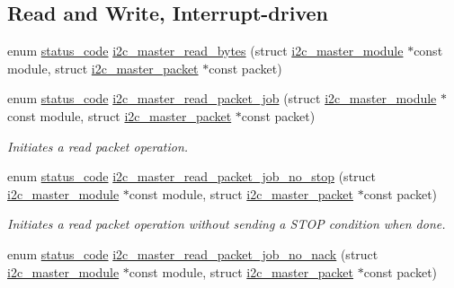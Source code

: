 \subsection*{Read and Write, Interrupt-\/driven}
\begin{DoxyCompactItemize}
\item 
enum \mbox{\hyperlink{group__group__sam0__utils__status__codes_ga751c892e5a46b8e7d282085a5a5bf151}{status\+\_\+code}} \mbox{\hyperlink{group__asfdoc__sam0__sercom__i2c__group_ga15590b71928847daf2826c9cc0482717}{i2c\+\_\+master\+\_\+read\+\_\+bytes}} (struct \mbox{\hyperlink{structi2c__master__module}{i2c\+\_\+master\+\_\+module}} $\ast$const module, struct \mbox{\hyperlink{structi2c__master__packet}{i2c\+\_\+master\+\_\+packet}} $\ast$const packet)
\item 
enum \mbox{\hyperlink{group__group__sam0__utils__status__codes_ga751c892e5a46b8e7d282085a5a5bf151}{status\+\_\+code}} \mbox{\hyperlink{group__asfdoc__sam0__sercom__i2c__group_ga909337c580a4cd52dd209baaf2d399af}{i2c\+\_\+master\+\_\+read\+\_\+packet\+\_\+job}} (struct \mbox{\hyperlink{structi2c__master__module}{i2c\+\_\+master\+\_\+module}} $\ast$const module, struct \mbox{\hyperlink{structi2c__master__packet}{i2c\+\_\+master\+\_\+packet}} $\ast$const packet)
\begin{DoxyCompactList}\small\item\em Initiates a read packet operation. \end{DoxyCompactList}\item 
enum \mbox{\hyperlink{group__group__sam0__utils__status__codes_ga751c892e5a46b8e7d282085a5a5bf151}{status\+\_\+code}} \mbox{\hyperlink{group__asfdoc__sam0__sercom__i2c__group_gaa56093f3196b0f0ff368fa2ee21827f9}{i2c\+\_\+master\+\_\+read\+\_\+packet\+\_\+job\+\_\+no\+\_\+stop}} (struct \mbox{\hyperlink{structi2c__master__module}{i2c\+\_\+master\+\_\+module}} $\ast$const module, struct \mbox{\hyperlink{structi2c__master__packet}{i2c\+\_\+master\+\_\+packet}} $\ast$const packet)
\begin{DoxyCompactList}\small\item\em Initiates a read packet operation without sending a S\+T\+OP condition when done. \end{DoxyCompactList}\item 
enum \mbox{\hyperlink{group__group__sam0__utils__status__codes_ga751c892e5a46b8e7d282085a5a5bf151}{status\+\_\+code}} \mbox{\hyperlink{group__asfdoc__sam0__sercom__i2c__group_gaaff359c3a99851202a0190014d823c29}{i2c\+\_\+master\+\_\+read\+\_\+packet\+\_\+job\+\_\+no\+\_\+nack}} (struct \mbox{\hyperlink{structi2c__master__module}{i2c\+\_\+master\+\_\+module}} $\ast$const module, struct \mbox{\hyperlink{structi2c__master__packet}{i2c\+\_\+master\+\_\+packet}} $\ast$const packet)

\end{DoxyCompactItemize}
